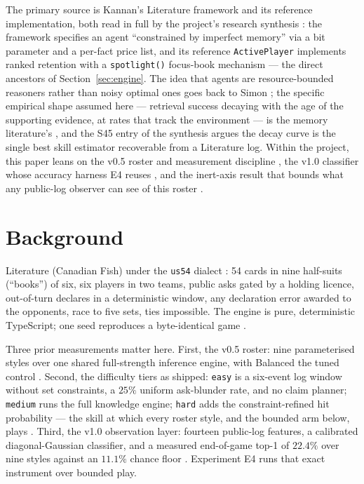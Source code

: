 \documentclass[11pt]{article}
\newcommand{\code}[1]{\texttt{#1}}
\newcommand{\usff}{\code{us54}}
\begin{document}
The primary source is Kannan's Literature framework and its reference implementation,
both read in full by the project's research synthesis \cite{kannan,playstyles}: the
framework specifies an agent ``constrained by imperfect memory'' via a bit parameter and
a per-fact price list, and its reference \code{ActivePlayer} implements ranked retention
with a \code{spotlight()} focus-book mechanism --- the direct ancestors of
Section~\ref{sec:engine}. The idea that agents are resource-bounded reasoners rather
than noisy optimal ones goes back to Simon \cite{simon1955}; the specific empirical
shape assumed here --- retrieval success decaying with the age of the supporting
evidence, at rates that track the environment --- is the memory literature's
\cite{andersonschooler1991}, and the S45 entry of the synthesis \cite{playstyles} argues
the decay curve is the single best skill estimator recoverable from a Literature log.
Within the project, this paper leans on the v0.5 roster and measurement discipline
\cite{v05paper}, the v1.0 classifier whose accuracy harness E4 reuses
\cite{v10paper,obspaper,fingerprints}, and the inert-axis result that bounds what any
public-log observer can see of this roster \cite{inertpaper,styles}.

\section{Background}
\label{sec:background}

Literature (Canadian Fish) under the \usff{} dialect \cite{rules,v05paper}: 54 cards in
nine half-suits (``books'') of six, six players in two teams, public asks gated by a
holding licence, out-of-turn declares in a deterministic window, any declaration error
awarded to the opponents, race to five sets, ties impossible. The engine is pure,
deterministic TypeScript; one seed reproduces a byte-identical game \cite{repo}.

Three prior measurements matter here. First, the v0.5 roster: nine parameterised styles
over one shared full-strength inference engine, with Balanced the tuned control
\cite{v05paper}. Second, the difficulty tiers as shipped: \code{easy} is a six-event log
window without set constraints, a $25\%$ uniform ask-blunder rate, and no claim planner;
\code{medium} runs the full knowledge engine; \code{hard} adds the constraint-refined
hit probability --- the skill at which every roster style, and the bounded arm below,
plays \cite{repo}. Third, the v1.0 observation layer: fourteen public-log features, a
calibrated diagonal-Gaussian classifier, and a measured end-of-game top-1 of $22.4\%$
over nine styles against an $11.1\%$ chance floor \cite{obspaper,adaptiveartifact}.
Experiment E4 runs that exact instrument over bounded play.
\end{document}
